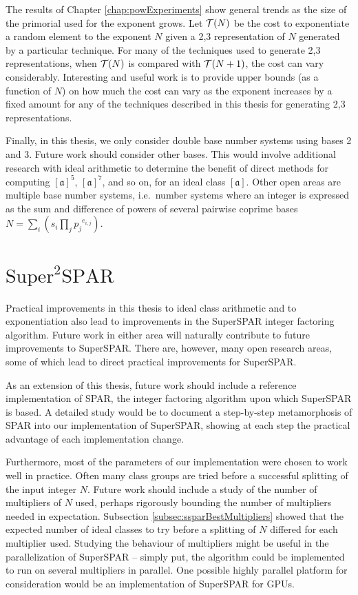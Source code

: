 \documentclass{ucalgthes1}
\theoremstyle{definition}
\newcommand{\ideal}{\mathfrak}
\newcommand{\idealclass}[1]{\left[ \ideal #1 \right]}
\newcommand{\aclass}{\idealclass a}
\begin{document}
The results of Chapter \ref{chap:powExperiments} show general trends as the size of the primorial used for the exponent grows.  Let $\mathcal T(N)$ be the cost to exponentiate a random element to the exponent $N$ given a 2,3 representation of $N$ generated by a particular technique.  For many of the techniques used to generate 2,3 representations, when $\mathcal T(N)$ is compared with $\mathcal T(N+1)$, the cost can vary considerably.  Interesting and useful work is to provide upper bounds (as a function of $N$) on how much the cost can vary as the exponent increases by a fixed amount for any of the techniques described in this thesis for generating 2,3 representations.

Finally, in this thesis, we only consider double base number systems using bases 2 and 3.  Future work should consider other bases.  This would involve additional research with ideal arithmetic to determine the benefit of direct methods for computing $\aclass^5$, $\aclass^7$, and so on, for an ideal class $\aclass$.  Other open areas are multiple base number systems, i.e.\ number systems where an integer is expressed as the sum and difference of powers of several pairwise coprime bases $N = \sum_i \left( s_i \prod_j {p_j}^{e_{i,j}} \right)$.


\section{$\textrm{Super}^2\textrm{SPAR}$}
\label{sec:futureSSPAR}

Practical improvements in this thesis to ideal class arithmetic and to exponentiation also lead to improvements in the SuperSPAR integer factoring algorithm.  Future work in either area will naturally contribute to future improvements to SuperSPAR.  There are, however, many open research areas, some of which lead to direct practical improvements for SuperSPAR.

As an extension of this thesis, future work should include a reference implementation of SPAR, the integer factoring algorithm upon which SuperSPAR is based.  A detailed study would be to document a step-by-step metamorphosis of SPAR into our implementation of SuperSPAR, showing at each step the practical advantage of each implementation change.  

Furthermore, most of the parameters of our implementation were chosen to work well in practice.  Often many class groups are tried before a successful splitting of the input integer $N$.  Future work should include a study of the number of multipliers of $N$ used, perhaps rigorously bounding the number of multipliers needed in expectation.  Subsection \ref{subsec:ssparBestMultipliers} showed that the expected number of ideal classes to try before a splitting of $N$ differed for each multiplier used.  Studying the behaviour of multipliers might be useful in the parallelization of SuperSPAR -- simply put, the algorithm could be implemented to run on several multipliers in parallel.  One possible highly parallel platform for consideration would be an implementation of SuperSPAR for GPUs.
\end{document}
